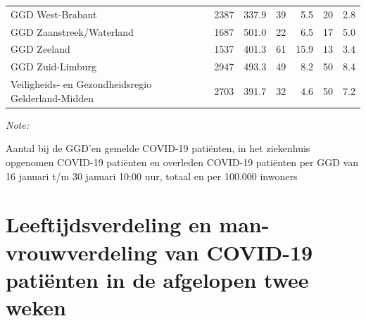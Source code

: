 \documentclass[
  english,
  man,floatsintext]{apa6}
\begin{document}
\begin{table}[H]
\begin{threeparttable}
\begin{tabular}{lrrrrrr}
GGD West-Brabant & 2387 & 337.9 & 39 & 5.5 & 20 & 2.8\\
GGD Zaanstreek/Waterland & 1687 & 501.0 & 22 & 6.5 & 17 & 5.0\\
GGD Zeeland & 1537 & 401.3 & 61 & 15.9 & 13 & 3.4\\
GGD Zuid-Limburg & 2947 & 493.3 & 49 & 8.2 & 50 & 8.4\\
Veiligheids- en Gezondheidsregio Gelderland-Midden & 2703 & 391.7 & 32 & 4.6 & 50 & 7.2\\
\bottomrule
\end{tabular}
\begin{tablenotes}
\item \textit{Note: } 
\item Aantal bij de GGD’en gemelde COVID-19 patiënten, in het ziekenhuis opgenomen COVID-19 patiënten en overleden COVID-19 patiënten per GGD van 16 januari t/m 30 januari 10:00 uur, totaal en per 100.000 inwoners
\end{tablenotes}
\end{threeparttable}
\endgroup{}
\end{table}

\newpage

\hypertarget{leeftijdsverdeling-en-man-vrouwverdeling-van-covid-19-patiuxebnten-in-de-afgelopen-twee-weken}{%
\section{Leeftijdsverdeling en man-vrouwverdeling van COVID-19 patiënten in de afgelopen twee weken}\label{leeftijdsverdeling-en-man-vrouwverdeling-van-covid-19-patiuxebnten-in-de-afgelopen-twee-weken}}
\end{document}
